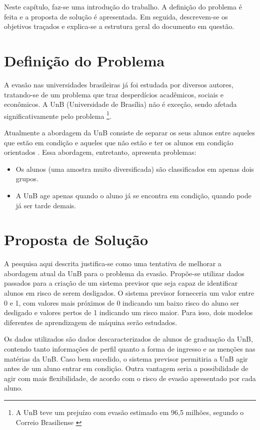 Neste capítulo, faz-se uma introdução do trabalho. A definição do problema é feita e
a proposta de solução é apresentada. Em seguida, descrevem-se os objetivos traçados e
explica-se a estrutura geral do documento em questão. 

\section{Definição do Problema}
A evasão nas universidades brasileiras já foi estudada por diversos autores,
tratando-se de um problema que traz desperdícios acadêmicos, sociais e econômicos.
A UnB (Universidade de Brasília) não é exceção, sendo afetada significativamente pelo
problema \footnote{A UnB teve um prejuízo com evasão estimado em 96,5 milhões,
segundo o Correio Brasiliense \cite{correio}}.

\par Atualmente a abordagem da UnB consiste de separar os seus alunos entre aqueles
que estão em condição e aqueles que não estão e ter os alunos em condição orientados
\cite{manual_calouro}. Essa abordagem, entretanto, apresenta problemas:
\begin{itemize}
    \item Os alunos (uma amostra muito diversificada) são classificados em apenas
dois grupos.
    \item A UnB age apenas quando o aluno já se encontra em condição, quando pode
já ser tarde demais.
\end{itemize}

\section{Proposta de Solução}
A pesquisa aqui descrita justifica-se como uma tentativa de melhorar a abordagem
atual da UnB para o problema da evasão. Propõe-se utilizar dados passados para
a criação de um sistema previsor que seja capaz de identificar alunos em risco de
serem desligados. O sistema previsor forneceria um valor entre 0 e 1, com valores
mais próximos de 0 indicando um baixo risco do aluno ser desligado e valores pertos de
1 indicando um risco maior. Para isso, dois modelos diferentes de aprendizagem de máquina
serão estudados. 
\par Os dados utilizados são dados descaracterizados de alunos de
graduação da UnB, contendo tanto informações de perfil quanto a forma de ingresso e
as menções nas matérias da UnB. Caso bem sucedido, o sistema previsor permitiria a
UnB agir antes de um aluno entrar em condição. Outra vantagem seria a possibilidade
de agir com mais flexibilidade, de acordo com o risco de evasão apresentado por cada
aluno.

